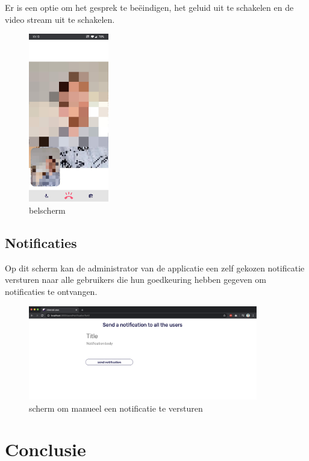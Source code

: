 		Er is een optie om het gesprek te beëindigen, het geluid uit te schakelen en de video stream uit te schakelen.
		\begin{figure}[H]
			\centering
			\includegraphics[width=35mm]{./img/POC/call.jpg}{}		
			\caption{belscherm}
		\end{figure}
		
	\subsection{Notificaties}
		Op dit scherm kan de administrator van de applicatie een zelf gekozen notificatie versturen naar alle gebruikers die hun goedkeuring hebben gegeven om notificaties te ontvangen.
		
		\begin{figure}[H]
			\centering
			\includegraphics[width=100mm]{./img/POC/sendNoti}{}		
			\caption{scherm om manueel een notificatie te versturen}
		\end{figure}
		

\section{Conclusie}

	

